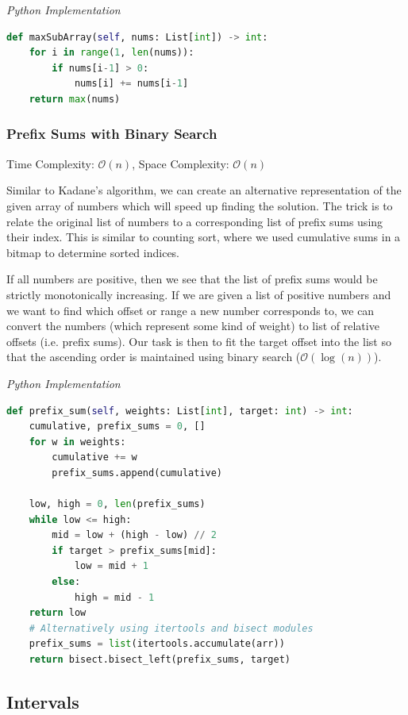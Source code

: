 \documentclass{article}
\newcommand{\bigO}{\mathcal{O}}
\begin{document}
\vspace{8pt} \emph{Python Implementation}
\begin{lstlisting}[language=Python]
def maxSubArray(self, nums: List[int]) -> int:
    for i in range(1, len(nums)):
        if nums[i-1] > 0:
            nums[i] += nums[i-1]
    return max(nums)
\end{lstlisting}

    \subsubsection{Prefix Sums with Binary Search}
    Time Complexity: $\bigO(n)$, Space Complexity: $\bigO(n)$
    
    Similar to Kadane's algorithm, we can create an alternative representation of the given array of numbers which will speed up finding the solution. The trick is to relate the original list of numbers to a corresponding list of prefix sums using their index. This is similar to counting sort, where we used cumulative sums in a bitmap to determine sorted indices.
    
    If all numbers are positive, then we see that the list of prefix sums would be strictly monotonically increasing. If we are given a list of positive numbers and we want to find which offset or range a new number corresponds to, we can convert the numbers (which represent some kind of weight) to list of relative offsets (i.e. prefix sums). Our task is then to fit the target offset into the list so that the ascending order is maintained using binary search ($\bigO(\log(n))$).

\vspace{8pt} \emph{Python Implementation}
\begin{lstlisting}[language=Python]
def prefix_sum(self, weights: List[int], target: int) -> int:
    cumulative, prefix_sums = 0, []
    for w in weights:
        cumulative += w
        prefix_sums.append(cumulative)

    low, high = 0, len(prefix_sums)
    while low <= high:
        mid = low + (high - low) // 2
        if target > prefix_sums[mid]:
            low = mid + 1
        else:
            high = mid - 1
    return low
    # Alternatively using itertools and bisect modules
    prefix_sums = list(itertools.accumulate(arr)) 
    return bisect.bisect_left(prefix_sums, target)
\end{lstlisting}

\subsection{Intervals}
\end{document}
